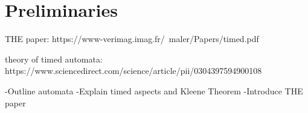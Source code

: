 \section{Preliminaries}

THE paper: https://www-verimag.imag.fr/~maler/Papers/timed.pdf

theory of timed automata: https://www.sciencedirect.com/science/article/pii/0304397594900108


-Outline automata
-Explain timed aspects and Kleene Theorem
-Introduce THE paper
